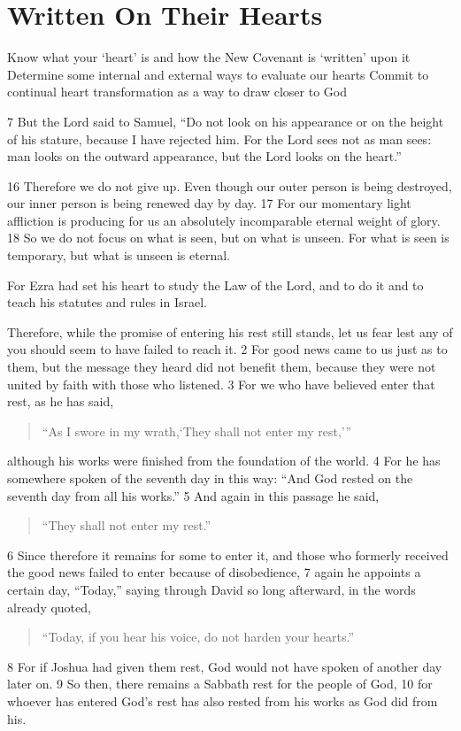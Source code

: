 \chapter{Written On Their Hearts}

\begin{goals}
\goal Know what your `heart' is and how the New Covenant is `written' upon it
\goal Determine some internal and external ways to evaluate our hearts
\goal Commit to continual heart transformation as a way to draw closer to God
\end{goals}

\begin{bible}
7 But the Lord said to Samuel, ``Do not look on his appearance or on the height of his stature, because I have rejected him. For the Lord sees not as man sees: man looks on the outward appearance, but the Lord looks on the heart.''

16 Therefore we do not give up. Even though our outer person is being destroyed, our inner person is being renewed day by day. 17 For our momentary light affliction is producing for us an absolutely incomparable eternal weight of glory. 18 So we do not focus on what is seen, but on what is unseen. For what is seen is temporary, but what is unseen is eternal.

For Ezra had set his heart to study the Law of the Lord, and to do it and to teach his statutes and rules in Israel.

Therefore, while the promise of entering his rest still stands, let us fear lest any of you should seem to have failed to reach it. 2 For good news came to us just as to them, but the message they heard did not benefit them, because they were not united by faith with those who listened. 3 For we who have believed enter that rest, as he has said,
\begin{quote}
``As I swore in my wrath,`They shall not enter my rest,'\thinspace''
\end{quote}
although his works were finished from the foundation of the world. 4 For he has somewhere spoken of the seventh day in this way: ``And God rested on the seventh day from all his works.'' 5 And again in this passage he said,
\begin{quote}
``They shall not enter my rest.''
\end{quote}
6 Since therefore it remains for some to enter it, and those who formerly received the good news failed to enter because of disobedience, 7 again he appoints a certain day, ``Today,'' saying through David so long afterward, in the words already quoted,
\begin{quote}
``Today, if you hear his voice, do not harden your hearts.''
\end{quote}
8 For if Joshua had given them rest, God would not have spoken of another day later on. 9 So then, there remains a Sabbath rest for the people of God, 10 for whoever has entered God's rest has also rested from his works as God did from his.


\end{bible}
